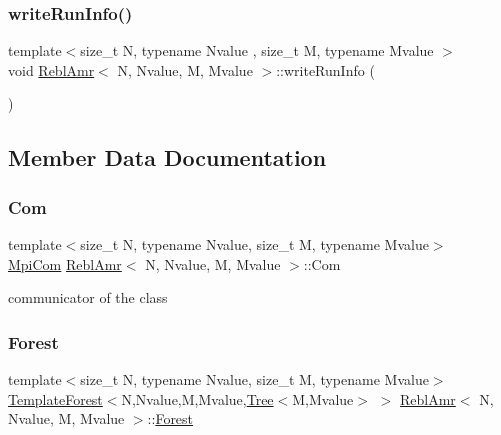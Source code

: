 \subsubsection{\texorpdfstring{write\+Run\+Info()}{writeRunInfo()}}
{\footnotesize\ttfamily template$<$size\+\_\+t N, typename Nvalue , size\+\_\+t M, typename Mvalue $>$ \\
void \mbox{\hyperlink{classReblAmr}{Rebl\+Amr}}$<$ N, Nvalue, M, Mvalue $>$\+::write\+Run\+Info (\begin{DoxyParamCaption}{ }\end{DoxyParamCaption})}



\subsection{Member Data Documentation}
\mbox{\label{classReblAmr_adf0b8e77455c3078cd6fb3049d9cbf95}} 
\subsubsection{\texorpdfstring{Com}{Com}}
{\footnotesize\ttfamily template$<$size\+\_\+t N, typename Nvalue, size\+\_\+t M, typename Mvalue$>$ \\
\mbox{\hyperlink{structMpiCom}{Mpi\+Com}} \mbox{\hyperlink{classReblAmr}{Rebl\+Amr}}$<$ N, Nvalue, M, Mvalue $>$\+::Com\hspace{0.3cm}{\ttfamily [private]}}

communicator of the class \mbox{\label{classReblAmr_a7f5abdc0afc3fcd2c62ae7e52f61a2fa}} 
\subsubsection{\texorpdfstring{Forest}{Forest}}
{\footnotesize\ttfamily template$<$size\+\_\+t N, typename Nvalue, size\+\_\+t M, typename Mvalue$>$ \\
\mbox{\hyperlink{classTemplateForest}{Template\+Forest}}$<$N,Nvalue,M,Mvalue,\mbox{\hyperlink{classTree}{Tree}}$<$M,Mvalue$>$ $>$ \mbox{\hyperlink{classReblAmr}{Rebl\+Amr}}$<$ N, Nvalue, M, Mvalue $>$\+::\mbox{\hyperlink{classForest}{Forest}}\hspace{0.3cm}{\ttfamily [private]}}

